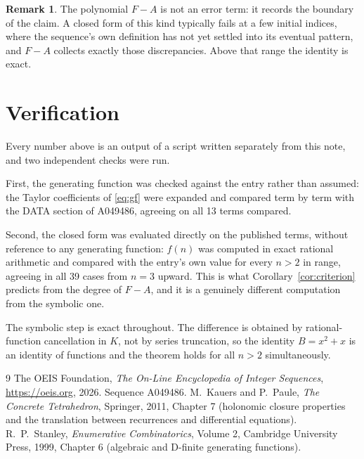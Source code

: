 \documentclass[11pt,a4paper]{article}
\theoremstyle{plain}
\theoremstyle{definition}
\newtheorem{remark}[theorem]{Remark}
\begin{document}
\begin{remark}
The polynomial $F-A$ is not an error term: it records the boundary of the claim. A closed
form of this kind typically fails at a few initial indices, where the sequence's own
definition has not yet settled into its eventual pattern, and $F-A$ collects exactly
those discrepancies. Above that range the identity is exact.
\end{remark}

\section{Verification}

Every number above is an output of a script written separately from this note, and two
independent checks were run.

First, the generating function was checked against the entry rather than assumed: the
Taylor coefficients of \eqref{eq:gf} were expanded and compared term by term with the DATA
section of A049486, agreeing on all 13 terms compared.

Second, the closed form was evaluated directly on the published terms, without reference
to any generating function: $f(n)$ was computed in exact rational arithmetic and compared
with the entry's own value for every $n>2$ in range, agreeing in all 39 cases
from $n=3$ upward. This is what Corollary~\ref{cor:criterion} predicts from the
degree of $F-A$, and it is a genuinely different computation from the symbolic one.

The symbolic step is exact throughout. The difference is obtained by rational-function
cancellation in $K$, not by series truncation, so the identity $B=x^{2} + x$ is an
identity of functions and the theorem holds for all $n>2$ simultaneously.

\begin{thebibliography}{9}
 The OEIS Foundation, \emph{The On-Line Encyclopedia of Integer Sequences},
\url{https://oeis.org}, 2026. Sequence A049486.
 M.~Kauers and P.~Paule, \emph{The Concrete Tetrahedron}, Springer, 2011,
Chapter 7 (holonomic closure properties and the translation between recurrences and
differential equations).
 R.~P.~Stanley, \emph{Enumerative Combinatorics}, Volume 2, Cambridge
University Press, 1999, Chapter 6 (algebraic and D-finite generating functions).
\end{thebibliography}
\end{document}
